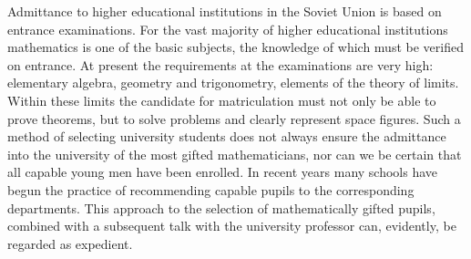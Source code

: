 Admittance to higher educational institutions in the Soviet Union is
based on entrance examinations. For the vast majority of higher
educational institutions mathematics is one of the basic subjects, the
knowledge of which must be verified on entrance. At present the
requirements at the examinations are very high: elementary algebra,
geometry and trigonometry, elements of the theory of limits. Within
these limits the candidate for matriculation must not only be able to
prove theorems, but to solve problems and clearly represent space
figures. Such a method of selecting university students does not
always ensure the admittance into the university of the most gifted
mathematicians, nor can we be certain that all capable young men have
been enrolled. In recent years many schools have begun the practice of
recommending capable pupils to the corresponding departments. This
approach to the selection of mathematically gifted pupils, combined
with a subsequent talk with the university professor can, evidently,
be regarded as expedient.
